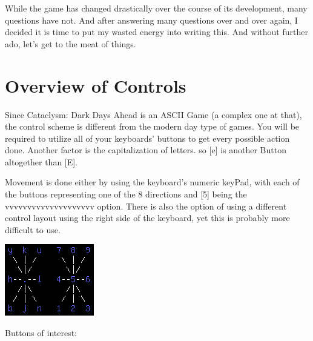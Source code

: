 \documentclass[11pt]{report}
\begin{document}
While the game has changed drastically over the course of its development, many questions have not. And after answering many questions over and over again, I decided it is time to put my wasted energy into writing this. And without further ado, let's get to the meat of things.

 
\chapter{Overview of Controls}
 
Since Cataclysm: Dark Days Ahead is an ASCII Game (a complex one at that), the control scheme is different from the modern day type of games. You will be required to utilize all of your keyboards' buttons to get every possible action done. Another factor is the capitalization of letters. so [e] is another Button altogether than [E].
 
Movement is done either by using the keyboard's numeric keyPad, with each of the buttons representing one of the 8 directions and [5] being the vvvvvvvvvvvvvvvvvvvv option. There is also the option of using a different control layout using the right side of the keyboard, yet this is probably more difficult to use.

\includegraphics{01}

Buttons of interest:
\end{document}
